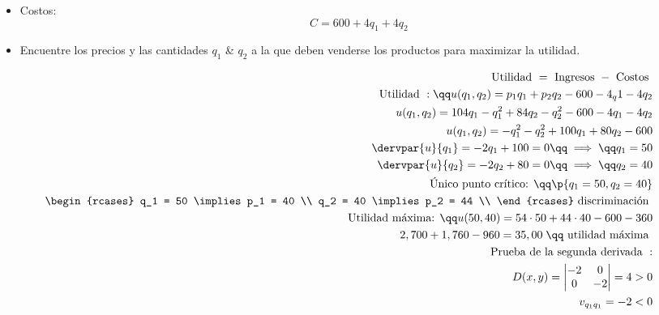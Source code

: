 \begin{enumerate}
\begin{itemize}
            \item Costos: 
                    \[
                      C = 600 + 4q_1 + 4q_2
                    \]
            
            \item Encuentre los precios y las cantidades $\displaystyle q_1$ \& $\displaystyle q_2$ a la que deben venderse los productos para maximizar la utilidad.
        \end{itemize}
        \begin{center}
           \begin{align*}
               \text{ Utilidad } = \text{ Ingresos } - \text{ Costos } \\ 
               \text{ Utilidad }: \qq u(q_1,q_2) = p_1q_1 + p_2q_2-600-4_q1-4q_2 \\ 
               u(q_1,q_2) = 104q_1 - q_1^2 + 84q_2 - q_2^2-600-4q_1-4q_2 \\ 
               u(q_1,q_2) = -q_1^2 - q_2^2 + 100q_1 + 80q_2 - 600 \\ 
               \dervpar{u}{q_1} = -2q_1 +100 = 0 \qq \implies  \qq q_1 = 50  \\ 
               \dervpar{u}{q_2} = -2q_2+80 = 0 \qq \implies  \qq  q_2 = 40 \\ 
               \text{ Único punto crítico:  } \qq \p{q_1=50, q_2=40} \\ 
               \begin{rcases}
                   q_1 = 50 \implies p_1 = 40 \\ 
                   q_2 = 40 \implies p_2 = 44 \\ 
               \end{rcases} \text{ discriminación } \\ 
               \text{ Utilidad máxima:  } \qq u(50,40) = 54\cdot 50 + 44 \cdot 40 - 600 - 360 \\ 
               2,700 + 1,760 - 960 = 35,00 \; \qq \text{ utilidad máxima } \\ 
               \text{ Prueba de la segunda derivada }: \\ 
               D(x,y) = \begin{vmatrix}
                   -2 & 0 \\ 
                   0 & -2 \\ 
               \end{vmatrix} = 4 > 0 \\ 
               v_{q_1q_1} = -2 <0 \\ 
           \end{align*}
        \end{center}
\end{enumerate}

